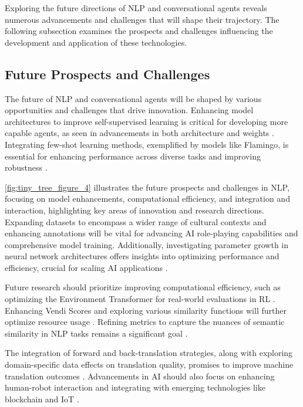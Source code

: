 Exploring the future directions of NLP and conversational agents reveals numerous advancements and challenges that will shape their trajectory. The following subsection examines the prospects and challenges influencing the development and application of these technologies.


\subsection{Future Prospects and Challenges} \label{subsec:Future Prospects and Challenges}

The future of NLP and conversational agents will be shaped by various opportunities and challenges that drive innovation. Enhancing model architectures to improve self-supervised learning is critical for developing more capable agents, as seen in advancements in both architecture and weights \cite{le2019evolvingselfsupervisedneuralnetworks}. Integrating few-shot learning methods, exemplified by models like Flamingo, is essential for enhancing performance across diverse tasks and improving robustness \cite{alayrac2022flamingo}.

\autoref{fig:tiny_tree_figure_4} illustrates the future prospects and challenges in NLP, focusing on model enhancements, computational efficiency, and integration and interaction, highlighting key areas of innovation and research directions. Expanding datasets to encompass a wider range of cultural contexts and enhancing annotations will be vital for advancing AI role-playing capabilities and comprehensive model training. Additionally, investigating parameter growth in neural network architectures offers insights into optimizing performance and efficiency, crucial for scaling AI applications \cite{chowdhery2023palm}.

Future research should prioritize improving computational efficiency, such as optimizing the Environment Transformer for real-world evaluations in RL \cite{wang2023environmenttransformerpolicyoptimization}. Enhancing Vendi Scores and exploring various similarity functions will further optimize resource usage \cite{pasarkar2024cousinsvendiscorefamily}. Refining metrics to capture the nuances of semantic similarity in NLP tasks remains a significant goal \cite{yamshchikov2020styletransferparaphraselookingsensible}.

The integration of forward and back-translation strategies, along with exploring domain-specific data effects on translation quality, promises to improve machine translation outcomes \cite{bogoychev2020domaintranslationesenoisesynthetic}. Advancements in AI should also focus on enhancing human-robot interaction and integrating with emerging technologies like blockchain and IoT \cite{pandy2024advancementsroboticsprocessautomation}.

